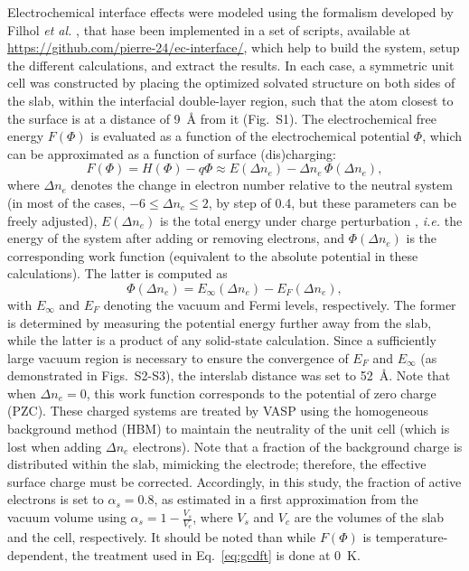 \documentclass[twoside,twocolumn,9pt]{article}
\begin{document}
Electrochemical interface effects were modeled using the formalism developed by Filhol \textit{et al.} \cite{hagopianAdvancementHomogeneousBackground2022}, that hase been implemented in a set of scripts, available at \url{https://github.com/pierre-24/ec-interface/}, which help to build the system, setup the different calculations, and extract the results. 
In each case, a symmetric unit cell was constructed by placing the optimized solvated structure on both sides of the slab, within the interfacial double-layer region, such that the atom closest to the surface is at a distance of \SI{9}{\angstrom} from it (Fig.~S1).
The electrochemical free energy $F(\Phi)$ is evaluated as a function of the electrochemical potential $\Phi$, which can be approximated as a function of surface (dis)charging:
\begin{equation}
	F(\Phi) = H(\Phi) - q\Phi \approx E(\Delta n_e) - \Delta n_e\,\Phi(\Delta n_e),
\end{equation}
where $\Delta n_e$ denotes the change in electron number relative to the neutral system (in most of the cases, $-6 \leq \Delta n_e \leq 2$, by step of 0.4, but these parameters can be freely adjusted), $E(\Delta n_e)$ is the total energy under charge perturbation , \textit{i.e.} the energy of the system after adding or removing electrons, and $\Phi(\Delta n_e)$ is the corresponding work function (equivalent to the absolute potential in these calculations). 
The latter is computed as
\begin{equation}
	\Phi(\Delta n_e) = E_\infty(\Delta n_e) - E_F(\Delta n_e), \label{eq:gcdft}
\end{equation}
with $E_\infty$ and $E_F$ denoting the vacuum and Fermi levels, respectively. 
The former is determined by measuring the potential energy further away from the slab, while the latter is a product of any solid-state calculation. 
Since a sufficiently large vacuum region is necessary to ensure the convergence of $E_F$ and $E_\infty$  (as demonstrated in Figs.~S2-S3), the interslab distance was set to \SI{52}{\angstrom}.
Note that when $\Delta n_e = 0$, this work function corresponds to the potential of zero charge (PZC).
These charged systems are treated  by VASP using the homogeneous background method (HBM) \cite{hagopianAdvancementHomogeneousBackground2022} to maintain the neutrality of the unit cell (which is lost when adding $\Delta n_e$ electrons). 
Note that a fraction of the background charge is distributed within the slab, mimicking the electrode; therefore, the effective surface charge must be corrected.  
Accordingly, in this study, the fraction of active electrons is set to $\alpha_s = 0.8$, as estimated in a first approximation from the vacuum volume using $\alpha_s = 1-\frac{V_s}{V_c}$, where $V_s$ and $V_c$ are the volumes of the slab and the cell, respectively\cite{hagopianAdvancementHomogeneousBackground2022}.  
It should be noted than while $F(\Phi)$ is temperature-dependent, the treatment used in Eq.~\eqref{eq:gcdft} is done at \SI{0}{\kelvin}.
\end{document}
